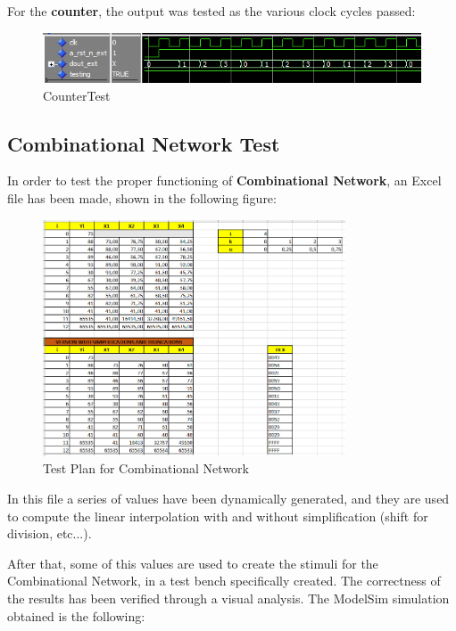 For the \textbf{counter}, the output was tested as the various clock cycles passed:

\begin{figure}[H]
    \centering
    \includegraphics[width=1\textwidth]{img/Chapter4/counter.png}
    \caption{CounterTest}
    \label{fig:CounterTest}
\end{figure}

\subsection{Combinational Network Test}

In order to test the proper functioning of \textbf{Combinational Network}, an Excel file has been made, shown in the following figure: 

\begin{figure}[H]
    \centering
    \includegraphics[width=0.8\textwidth]{img/Chapter4/Excel.png}
    \caption{Test Plan for Combinational Network}
    \label{fig:CNExcel1}
\end{figure}

In this file a series of values have been dynamically generated, and they are used to compute the linear interpolation with and without simplification (shift for division, etc...).

After that, some of this values are used to create the stimuli for the Combinational Network, in a test bench specifically created. The correctness of the results has been verified through a visual analysis. The ModelSim simulation obtained is the following:

